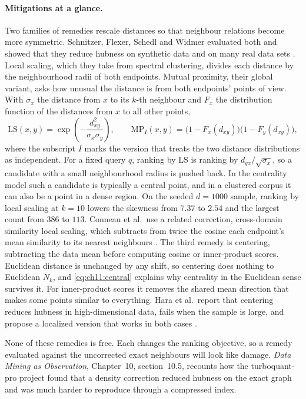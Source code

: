 \paragraph{Mitigations at a glance.} Two families of remedies rescale distances so that neighbour relations become more symmetric. Schnitzer, Flexer, Schedl and Widmer evaluated both and showed that they reduce hubness on synthetic data and on many real data sets \cite{schnitzer2012}. Local scaling, which they take from spectral clustering, divides each distance by the neighbourhood radii of both endpoints. Mutual proximity, their global variant, asks how unusual the distance is from both endpoints' points of view. With $\sigma_x$ the distance from $x$ to its $k$-th neighbour and $F_x$ the distribution function of the distances from $x$ to all other points,
\begin{equation}\label{eq:ch11:ls}
\mathrm{LS}(x,y)=\exp\!\left(-\frac{d_{xy}^2}{\sigma_x\sigma_y}\right),\qquad
\mathrm{MP}_I(x,y)=\big(1-F_x(d_{xy})\big)\big(1-F_y(d_{xy})\big),
\end{equation}
where the subscript $I$ marks the version that treats the two distance distributions as independent. For a fixed query $q$, ranking by $\mathrm{LS}$ is ranking by $d_{qx}/\sqrt{\sigma_x}$, so a candidate with a small neighbourhood radius is pushed back. In the centrality model such a candidate is typically a central point, and in a clustered corpus it can also be a point in a dense region. On the seeded $d=1000$ sample, ranking by local scaling at $k=10$ lowers the skewness from $7.37$ to $2.54$ and the largest count from $386$ to $113$. Conneau et al.\ use a related correction, cross-domain similarity local scaling, which subtracts from twice the cosine each endpoint's mean similarity to its nearest neighbours \cite{conneau2018}. The third remedy is centering, subtracting the data mean before computing cosine or inner-product scores. Euclidean distance is unchanged by any shift, so centering does nothing to Euclidean $N_k$, and \cref{eq:ch11:central} explains why centrality in the Euclidean sense survives it. For inner-product scores it removes the shared mean direction that makes some points similar to everything. Hara et al.\ report that centering reduces hubness in high-dimensional data, fails when the sample is large, and propose a localized version that works in both cases \cite{hara2015}.

None of these remedies is free. Each changes the ranking objective, so a remedy evaluated against the uncorrected exact neighbours will look like damage. \emph{Data Mining as Observation}, Chapter~10, section~10.5, recounts how the turboquant-pro project found that a density correction reduced hubness on the exact graph and was much harder to reproduce through a compressed index.

